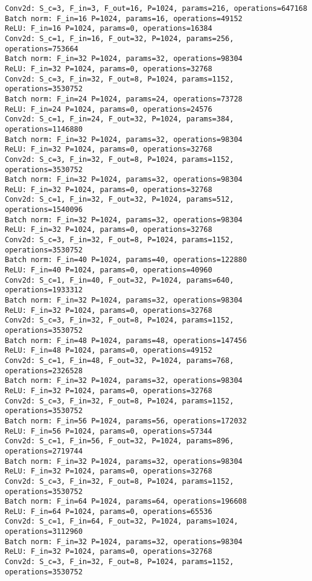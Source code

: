 \begin{Verbatim}[fontsize=\small]
Conv2d: S_c=3, F_in=3, F_out=16, P=1024, params=216, operations=647168
Batch norm: F_in=16 P=1024, params=16, operations=49152
ReLU: F_in=16 P=1024, params=0, operations=16384
Conv2d: S_c=1, F_in=16, F_out=32, P=1024, params=256, operations=753664
Batch norm: F_in=32 P=1024, params=32, operations=98304
ReLU: F_in=32 P=1024, params=0, operations=32768
Conv2d: S_c=3, F_in=32, F_out=8, P=1024, params=1152, operations=3530752
Batch norm: F_in=24 P=1024, params=24, operations=73728
ReLU: F_in=24 P=1024, params=0, operations=24576
Conv2d: S_c=1, F_in=24, F_out=32, P=1024, params=384, operations=1146880
Batch norm: F_in=32 P=1024, params=32, operations=98304
ReLU: F_in=32 P=1024, params=0, operations=32768
Conv2d: S_c=3, F_in=32, F_out=8, P=1024, params=1152, operations=3530752
Batch norm: F_in=32 P=1024, params=32, operations=98304
ReLU: F_in=32 P=1024, params=0, operations=32768
Conv2d: S_c=1, F_in=32, F_out=32, P=1024, params=512, operations=1540096
Batch norm: F_in=32 P=1024, params=32, operations=98304
ReLU: F_in=32 P=1024, params=0, operations=32768
Conv2d: S_c=3, F_in=32, F_out=8, P=1024, params=1152, operations=3530752
Batch norm: F_in=40 P=1024, params=40, operations=122880
ReLU: F_in=40 P=1024, params=0, operations=40960
Conv2d: S_c=1, F_in=40, F_out=32, P=1024, params=640, operations=1933312
Batch norm: F_in=32 P=1024, params=32, operations=98304
ReLU: F_in=32 P=1024, params=0, operations=32768
Conv2d: S_c=3, F_in=32, F_out=8, P=1024, params=1152, operations=3530752
Batch norm: F_in=48 P=1024, params=48, operations=147456
ReLU: F_in=48 P=1024, params=0, operations=49152
Conv2d: S_c=1, F_in=48, F_out=32, P=1024, params=768, operations=2326528
Batch norm: F_in=32 P=1024, params=32, operations=98304
ReLU: F_in=32 P=1024, params=0, operations=32768
Conv2d: S_c=3, F_in=32, F_out=8, P=1024, params=1152, operations=3530752
Batch norm: F_in=56 P=1024, params=56, operations=172032
ReLU: F_in=56 P=1024, params=0, operations=57344
Conv2d: S_c=1, F_in=56, F_out=32, P=1024, params=896, operations=2719744
Batch norm: F_in=32 P=1024, params=32, operations=98304
ReLU: F_in=32 P=1024, params=0, operations=32768
Conv2d: S_c=3, F_in=32, F_out=8, P=1024, params=1152, operations=3530752
Batch norm: F_in=64 P=1024, params=64, operations=196608
ReLU: F_in=64 P=1024, params=0, operations=65536
Conv2d: S_c=1, F_in=64, F_out=32, P=1024, params=1024, operations=3112960
Batch norm: F_in=32 P=1024, params=32, operations=98304
ReLU: F_in=32 P=1024, params=0, operations=32768
Conv2d: S_c=3, F_in=32, F_out=8, P=1024, params=1152, operations=3530752

\end{Verbatim}
